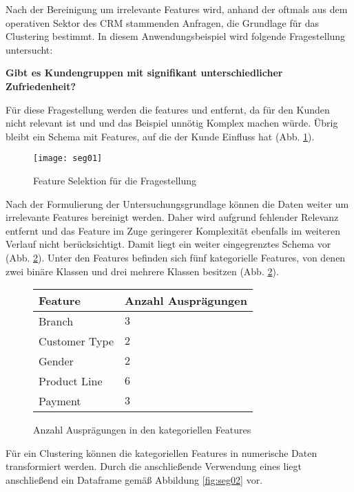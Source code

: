 Nach der Bereinigung um irrelevante Features wird, anhand der oftmals aus dem operativen Sektor des CRM stammenden Anfragen, die Grundlage für das Clustering bestimmt.
In diesem Anwendungsbeispiel wird folgende Fragestellung untersucht:

\begin{center}
  \textbf{Gibt es Kundengruppen mit signifikant unterschiedlicher Zufriedenheit?}
\end{center}

Für diese Fragestellung werden die features  und  entfernt, da  für den Kunden nicht relevant ist und und  das Beispiel unnötig Komplex machen würde. Übrig bleibt ein Schema mit Features, auf die der Kunde Einfluss hat (Abb. \ref{fig:fs01}).

\begin{figure}[ht]
  \centering
  \texttt{[image: seg01]}
  \caption{Feature Selektion für die Fragestellung}
  \label{fig:fs01}
\end{figure}

Nach der Formulierung der Untersuchungsgrundlage können die Daten weiter um irrelevante Features bereinigt werden.
Daher wird  aufgrund fehlender Relevanz entfernt und das Feature  im Zuge geringerer Komplexität ebenfalls im weiteren Verlauf nicht berücksichtigt.
Damit liegt ein weiter eingegrenztes Schema vor (Abb. \ref{fig:numfeat}).
Unter den Features befinden sich fünf kategorielle Features, von denen zwei binäre Klassen und drei mehrere Klassen besitzen (Abb. \ref{fig:numfeat}).

\begin{figure}[ht]
  \centering
  \begin{tabular}{l | l}
    Feature & Anzahl Ausprägungen\\
    \hline
    Branch & $3$\\
    Customer Type & $2$\\
    Gender & $2$\\
    Product Line & $6$\\
    Payment & $3$
  \end{tabular}
  \caption{Anzahl Ausprägungen in den kategoriellen Features}
  \label{fig:numfeat}
\end{figure}

Für ein Clustering können die kategoriellen Features in numerische Daten transformiert werden.
Durch die anschließende Verwendung eines  liegt anschließend ein Dataframe gemäß Abbildung \ref{fig:seg02} vor.

